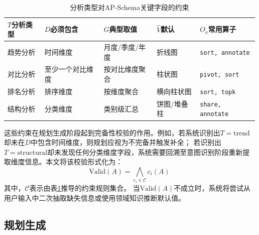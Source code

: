\begin{table}[htbp]
	\setlength{\abovecaptionskip}{5pt}
	\setlength{\belowcaptionskip}{5pt}
	\caption{分析类型对AP-Schema关键字段的约束}\label{tab:ap_schema_constraints}
	\centering
	\footnotesize
    \renewcommand{\arraystretch}{1.4}
	\begin{tabular}{p{2.0cm}p{3.0cm}p{2.6cm}p{2.0cm}p{3cm}}
		\toprule
		$T$分析类型 & $D$必须包含 & $G$典型取值 & $\hat{V}$默认 & $O_a$常用算子 \\
		\midrule
			趋势分析 & 时间维度 & 月度/季度/年度 & 折线图 & \texttt{sort, annotate} \\
			对比分析 & 至少一个对比维度 & 按对比维度聚合 & 柱状图 & \texttt{pivot, sort} \\
			排名分析 & 排序维度 & 按维度聚合 & 横向柱状图 & \texttt{sort, topk} \\
			结构分析 & 分类维度 & 类别级汇总 & 饼图/堆叠柱 & \texttt{share, annotate} \\
			\bottomrule
		\end{tabular}
\end{table}

这些约束在规划生成阶段起到完备性校验的作用。例如，若系统识别出$T=\text{trend}$却未在$D$中包含时间维度，则规划应视为不完备并触发补全；
若识别出$T=\text{structural}$却未发现任何分类维度字段，系统需要回溯至意图识别阶段重新提取维度信息。本文将该校验形式化为：
\begin{equation}
\text{Valid}(A) = \bigwedge_{c_i \in \mathcal{C}} c_i(A)
\label{eq:ap_valid}
\end{equation}
其中，$\mathcal{C}$表示由表\ref{tab:ap_schema_constraints}推导的约束规则集合。
当$\text{Valid}(A)$不成立时，系统将尝试从用户输入中二次抽取缺失信息或使用领域知识推断默认值。



\subsection{规划生成}\label{subsec:ap_schema_build}

